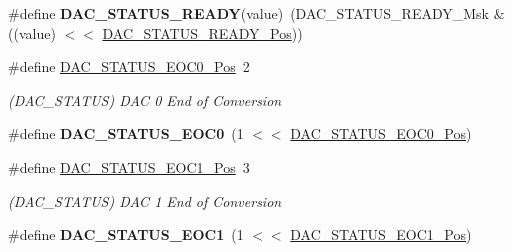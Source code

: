 \begin{DoxyCompactItemize}
\item 
\hypertarget{group___s_a_m_l21___d_a_c_gafdaf31debc3fa3947643da0a5897b4cb}{}\#define {\bfseries D\+A\+C\+\_\+\+S\+T\+A\+T\+U\+S\+\_\+\+R\+E\+A\+D\+Y}(value)~(D\+A\+C\+\_\+\+S\+T\+A\+T\+U\+S\+\_\+\+R\+E\+A\+D\+Y\+\_\+\+Msk \& ((value) $<$$<$ \hyperlink{group___s_a_m_l21___d_a_c_ga466a35ff7aea713f86197f0fba85d7ae}{D\+A\+C\+\_\+\+S\+T\+A\+T\+U\+S\+\_\+\+R\+E\+A\+D\+Y\+\_\+\+Pos}))\label{group___s_a_m_l21___d_a_c_gafdaf31debc3fa3947643da0a5897b4cb}

\item 
\hypertarget{group___s_a_m_l21___d_a_c_gae9501a2a26e724e737609569a91c03d3}{}\#define \hyperlink{group___s_a_m_l21___d_a_c_gae9501a2a26e724e737609569a91c03d3}{D\+A\+C\+\_\+\+S\+T\+A\+T\+U\+S\+\_\+\+E\+O\+C0\+\_\+\+Pos}~2\label{group___s_a_m_l21___d_a_c_gae9501a2a26e724e737609569a91c03d3}

\begin{DoxyCompactList}\small\item\em (D\+A\+C\+\_\+\+S\+T\+A\+T\+U\+S) D\+A\+C 0 End of Conversion \end{DoxyCompactList}\item 
\hypertarget{group___s_a_m_l21___d_a_c_ga13a307f1049418d656379376b7adc281}{}\#define {\bfseries D\+A\+C\+\_\+\+S\+T\+A\+T\+U\+S\+\_\+\+E\+O\+C0}~(1 $<$$<$ \hyperlink{group___s_a_m_l21___d_a_c_gae9501a2a26e724e737609569a91c03d3}{D\+A\+C\+\_\+\+S\+T\+A\+T\+U\+S\+\_\+\+E\+O\+C0\+\_\+\+Pos})\label{group___s_a_m_l21___d_a_c_ga13a307f1049418d656379376b7adc281}

\item 
\hypertarget{group___s_a_m_l21___d_a_c_gaa4eeac4108e1883eb87c11c9c2f122be}{}\#define \hyperlink{group___s_a_m_l21___d_a_c_gaa4eeac4108e1883eb87c11c9c2f122be}{D\+A\+C\+\_\+\+S\+T\+A\+T\+U\+S\+\_\+\+E\+O\+C1\+\_\+\+Pos}~3\label{group___s_a_m_l21___d_a_c_gaa4eeac4108e1883eb87c11c9c2f122be}

\begin{DoxyCompactList}\small\item\em (D\+A\+C\+\_\+\+S\+T\+A\+T\+U\+S) D\+A\+C 1 End of Conversion \end{DoxyCompactList}\item 
\hypertarget{group___s_a_m_l21___d_a_c_gaded6ad2537cc27740161c146e14b5feb}{}\#define {\bfseries D\+A\+C\+\_\+\+S\+T\+A\+T\+U\+S\+\_\+\+E\+O\+C1}~(1 $<$$<$ \hyperlink{group___s_a_m_l21___d_a_c_gaa4eeac4108e1883eb87c11c9c2f122be}{D\+A\+C\+\_\+\+S\+T\+A\+T\+U\+S\+\_\+\+E\+O\+C1\+\_\+\+Pos})\label{group___s_a_m_l21___d_a_c_gaded6ad2537cc27740161c146e14b5feb}


\end{DoxyCompactItemize}
